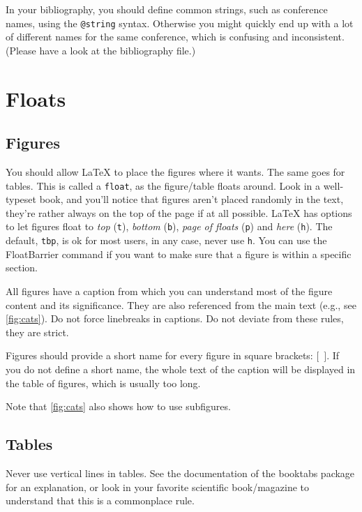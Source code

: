 \documentclass[../{{cookiecutter.project_slug}}.tex]{subfiles}
\begin{document}
    In  your  bibliography, you  should  define  common strings,  such  as 
    conference  names, using  the  \verb|@string|  syntax.  Otherwise  you 
    might  quickly end  up with  a  lot of  different names  for the  same 
    conference, which is confusing and  inconsistent.  (Please have a look 
    at the bibliography file.)                                             

    \section{Floats}
    \subsection{Figures}
    You should  allow \LaTeX{} to place  the figures where it  wants.  The 
    same  goes  for  tables.   This  is  called  a  \verb+float+,  as  the 
    figure/table floats around.   Look in a well-typeset  book, and you'll 
    notice that figures aren't placed randomly in the text, they're rather 
    always  on the  top  of  the page  if  at  all possible. \LaTeX{}  has 
    options to  let figures float to  \emph{top} (\verb+t+), \emph{bottom} 
    (\verb+b+),   \emph{page  of   floats}   (\verb+p+)  and   \emph{here} 
    (\verb+h+).  The  default, \verb+tbp+, is  ok for most users,  in any 
    case, never use \verb+h+.  You can use the FloatBarrier command if you 
    want to make sure that a figure is within a specific section.          

    All figures have  a caption from which you can  understand most of the 
    figure content  and its significance.   They are also  referenced from 
    the main text (e.g., see \cref{fig:cats}).  Do not force linebreaks in 
    captions.  Do not deviate from these rules, they are strict.           

    Figures  should  provide a  short  name  for  every figure  in  square 
    brackets: $[$~$]$. If  you do not define a short  name, the whole text 
    of the caption will be displayed in the table of figures, which is 
    usually too long.
    
    Note that \cref{fig:cats} also shows how to use subfigures.



    \subsection{Tables}
    Never  use vertical  lines in  tables.  See  the documentation  of the 
    booktabs  package  for  an  explanation,  or  look  in  your  favorite 
    scientific  book/magazine to  understand  that this  is a  commonplace 
    rule.                                                                  
\end{document}
